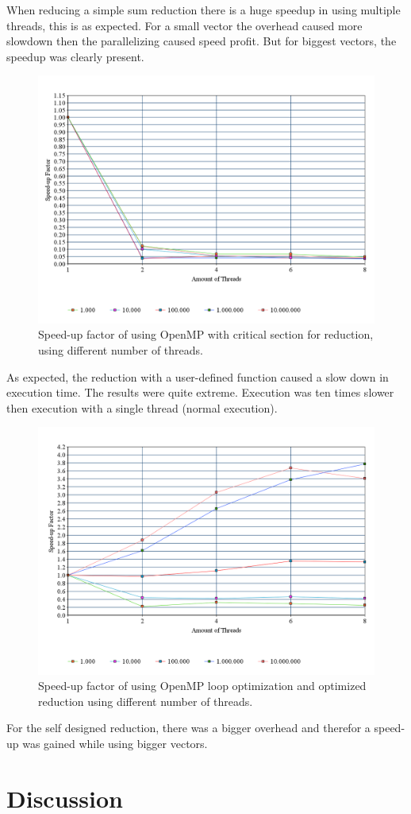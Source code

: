 \documentclass[a4paper,12px]{article}
\begin{document}
When reducing a simple sum reduction there is a huge speedup in using multiple
threads, this is as expected. For a small vector the overhead caused more
slowdown then the parallelizing caused speed profit. But for biggest vectors,
the speedup was clearly present.

\begin{figure}[H]
    \centering
    \includegraphics[width=\textwidth]{reduce}
    \caption{Speed-up factor of using OpenMP with critical section for
    reduction, using different number of threads.}
\end{figure}

As expected, the reduction with a user-defined function caused a slow down in
execution time. The results were quite extreme. Execution was ten times slower
then execution with a single thread (normal execution).


\begin{figure}[H]
    \centering
    \includegraphics[width=\textwidth]{reduce2}
    \caption{Speed-up factor of using OpenMP loop optimization and optimized
    reduction using different number of threads.}
\end{figure}

For the self designed reduction, there was a bigger overhead and therefor a
speed-up was gained while using bigger vectors.

\section{Discussion}




%
%
\end{document}
